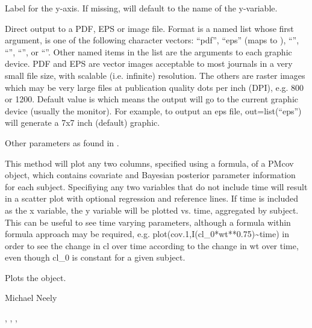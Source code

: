\documentclass[a4paper]{book}
\begin{document}
\begin{Arguments}
\begin{ldescription}
\item[\code{ylab}] Label for the y-axis.  If missing, will default to the name of the y-variable.

\item[\code{out}] Direct output to a PDF, EPS or image file.  Format is a named list whose first argument, 
 is one of the following character vectors: ``pdf'', ``eps'' (maps to ),
``'', ``'', ``'', or ``''.  Other named items in the list
are the arguments to each graphic device. PDF and EPS are vector images acceptable to most journals
in a very small file size, with scalable (i.e. infinite) resolution.  The others are raster images which may be very
large files at publication quality dots per inch (DPI), e.g. 800 or 1200. Default value is  which means the 
output will go to the current graphic device (usually the monitor). For example, to output an eps file,
out=list(``eps'') will generate a 7x7 inch (default) graphic.

\item[\code{...}] Other parameters as found in .
\end{ldescription}
\end{Arguments}
%
\begin{Details}\relax
This method will plot any two columns, specified using a formula, of a PMcov object, which contains covariate and Bayesian posterior parameter information
for each subject.  Specifiying any two variables that do not include time will result in a scatter plot with optional regression and reference lines.  If
time is included as the x variable, the y variable will be plotted vs. time, aggregated by subject.  This can be useful to see time varying parameters,
although a formula within formula approach may be required, e.g. plot(cov.1,I(cl\_0*wt**0.75)\textasciitilde{}time) in order to see the change in cl over time according to 
the change in wt over time, even though cl\_0 is constant for a given subject.
\end{Details}
%
\begin{Value}
Plots the object.
\end{Value}
%
\begin{Author}\relax
Michael Neely
\end{Author}
%
\begin{SeeAlso}\relax
{}, , , 
\end{SeeAlso}
\end{document}
